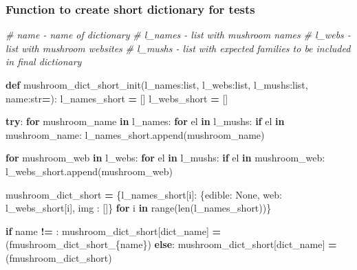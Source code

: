 \documentclass[
]{article}
\newenvironment{Shaded}{\begin{snugshade}}{\end{snugshade}}
\newcommand{\BuiltInTok}[1]{#1}
\newcommand{\CommentTok}[1]{\textcolor[rgb]{0.56,0.35,0.01}{\textit{#1}}}
\newcommand{\ControlFlowTok}[1]{\textcolor[rgb]{0.13,0.29,0.53}{\textbf{#1}}}
\newcommand{\KeywordTok}[1]{\textcolor[rgb]{0.13,0.29,0.53}{\textbf{#1}}}
\newcommand{\NormalTok}[1]{#1}
\newcommand{\OperatorTok}[1]{\textcolor[rgb]{0.81,0.36,0.00}{\textbf{#1}}}
\newcommand{\SpecialCharTok}[1]{\textcolor[rgb]{0.00,0.00,0.00}{#1}}
\newcommand{\SpecialStringTok}[1]{\textcolor[rgb]{0.31,0.60,0.02}{#1}}
\newcommand{\StringTok}[1]{\textcolor[rgb]{0.31,0.60,0.02}{#1}}
\newcommand{\VariableTok}[1]{\textcolor[rgb]{0.00,0.00,0.00}{#1}}
\begin{document}
\hypertarget{function-to-create-short-dictionary-for-tests}{%
\subsubsection{Function to create short dictionary for
tests}\label{function-to-create-short-dictionary-for-tests}}

\begin{Shaded}
\begin{Highlighting}[]
\CommentTok{\# name {-} name of dictionary}
\CommentTok{\# l\_names {-} list with mushroom names}
\CommentTok{\# l\_webs {-} list with mushroom websites}
\CommentTok{\# l\_mushs {-} list with expected families to be included in final dictionary}

\KeywordTok{def}\NormalTok{ mushroom\_dict\_short\_init(l\_names:}\BuiltInTok{list}\NormalTok{, l\_webs:}\BuiltInTok{list}\NormalTok{, l\_mushs:}\BuiltInTok{list}\NormalTok{, name:}\BuiltInTok{str}\OperatorTok{=}\StringTok{\textquotesingle{}\textquotesingle{}}\NormalTok{):}
\NormalTok{    l\_names\_short }\OperatorTok{=}\NormalTok{ []}
\NormalTok{    l\_webs\_short }\OperatorTok{=}\NormalTok{ []}

    \ControlFlowTok{try}\NormalTok{:}
        \ControlFlowTok{for}\NormalTok{ mushroom\_name }\KeywordTok{in}\NormalTok{ l\_names:}
            \ControlFlowTok{for}\NormalTok{ el }\KeywordTok{in}\NormalTok{ l\_mushs:}
                \ControlFlowTok{if}\NormalTok{ el }\KeywordTok{in}\NormalTok{ mushroom\_name:}
\NormalTok{                    l\_names\_short.append(mushroom\_name)}

        \ControlFlowTok{for}\NormalTok{ mushroom\_web }\KeywordTok{in}\NormalTok{ l\_webs:}
            \ControlFlowTok{for}\NormalTok{ el }\KeywordTok{in}\NormalTok{ l\_mushs:}
                \ControlFlowTok{if}\NormalTok{ el }\KeywordTok{in}\NormalTok{ mushroom\_web:}
\NormalTok{                    l\_webs\_short.append(mushroom\_web)}

\NormalTok{        mushroom\_dict\_short }\OperatorTok{=}\NormalTok{ \{l\_names\_short[i]: \{}\StringTok{\textquotesingle{}edible\textquotesingle{}}\NormalTok{: }\VariableTok{None}\NormalTok{, }\StringTok{\textquotesingle{}web\textquotesingle{}}\NormalTok{: l\_webs\_short[i], }\StringTok{\textquotesingle{}img\textquotesingle{}}\NormalTok{ : []\} }\ControlFlowTok{for}\NormalTok{ i }\KeywordTok{in} \BuiltInTok{range}\NormalTok{(}\BuiltInTok{len}\NormalTok{(l\_names\_short))\}}

        \ControlFlowTok{if}\NormalTok{ name }\OperatorTok{!=} \StringTok{\textquotesingle{}\textquotesingle{}}\NormalTok{:}
\NormalTok{            mushroom\_dict\_short[}\StringTok{\textquotesingle{}dict\_name\textquotesingle{}}\NormalTok{] }\OperatorTok{=}\NormalTok{ (}\SpecialStringTok{f\textquotesingle{}mushroom\_dict\_short\_}\SpecialCharTok{\{}\NormalTok{name}\SpecialCharTok{\}}\SpecialStringTok{\textquotesingle{}}\NormalTok{)}
        \ControlFlowTok{else}\NormalTok{:}
\NormalTok{            mushroom\_dict\_short[}\StringTok{\textquotesingle{}dict\_name\textquotesingle{}}\NormalTok{] }\OperatorTok{=}\NormalTok{ (}\SpecialStringTok{f\textquotesingle{}mushroom\_dict\_short\textquotesingle{}}\NormalTok{)}


\end{Highlighting}
\end{Shaded}
\end{document}
